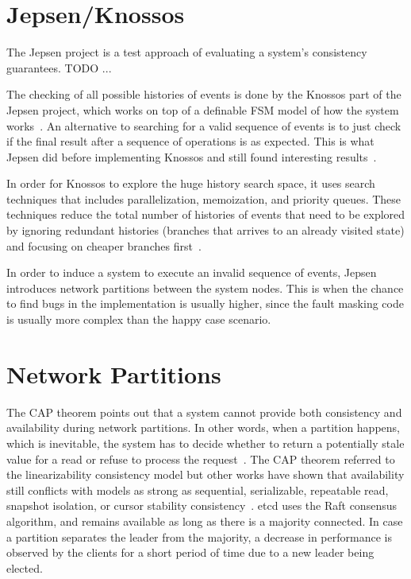 \documentclass[12pt,conference]{IEEEtran}
\begin{document}
\section{Jepsen/Knossos}

The Jepsen project is a test approach of evaluating a system's consistency guarantees. TODO ...

The checking of all possible histories of events is done by the Knossos part of the Jepsen project, which works on top of a definable FSM model of how the system works~\cite{knossosPostWebsite}. An alternative to searching for a valid sequence of events is to just check if the final result after a sequence of operations is as expected. This is what Jepsen did before implementing Knossos and still found interesting results~\cite{jepsenWebsite}.

In order for Knossos to explore the huge history search space, it uses search techniques that includes parallelization, memoization, and priority queues. These techniques reduce the total number of histories of events that need to be explored by ignoring redundant histories (branches that arrives to an already visited state) and focusing on cheaper branches first~\cite{knossosPostWebsite2}.

In order to induce a system to execute an invalid sequence of events, Jepsen introduces network partitions between the system nodes. This is when the chance to find bugs in the implementation is usually higher, since the fault masking code is usually more complex than the happy case scenario.

\section{Network Partitions}

The CAP theorem points out that a system cannot provide both consistency and availability during network partitions. In other words, when a partition happens, which is inevitable, the system has to decide whether to return a potentially stale value for a read or refuse to process the request~\cite{brewer2012cap}. The CAP theorem referred to the linearizability consistency model but other works have shown that availability still conflicts with models as strong as sequential, serializable, repeatable read, snapshot isolation, or cursor stability consistency~\cite{strongConsistencyWebsite,bailis2013hat}. etcd uses the Raft consensus algorithm, and remains available as long as there is a majority connected. In case a partition separates the leader from the majority, a decrease in performance is observed by the clients for a short period of time due to a new leader being elected.
\end{document}
